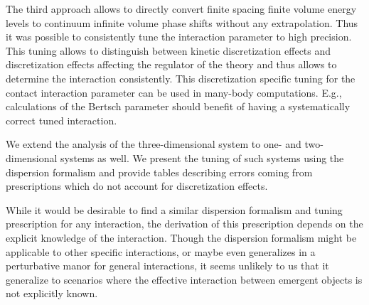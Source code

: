 The third approach allows to directly convert finite spacing finite volume energy levels to continuum infinite volume phase shifts without any extrapolation.
Thus it was possible to consistently tune the interaction parameter to high precision.
This tuning allows to distinguish between kinetic discretization effects and discretization effects affecting the regulator of the theory and thus allows to determine the interaction consistently.
This discretization specific tuning for the contact interaction parameter can be used in many-body computations.
E.g., calculations of the Bertsch parameter should benefit of having a systematically correct tuned interaction.

We extend the analysis of the three-dimensional system to one- and two-dimensional systems as well.
We present the tuning of such systems using the dispersion formalism and provide tables describing errors coming from prescriptions which do not account for discretization effects.

While it would be desirable to find a similar dispersion formalism and tuning prescription for any interaction, the derivation of this prescription depends on the explicit knowledge of the interaction.
Though the dispersion formalism might be applicable to other specific interactions, or maybe even generalizes in a perturbative manor for general interactions, it seems unlikely to us that it generalize to scenarios where the effective interaction between emergent objects is not explicitly known.


